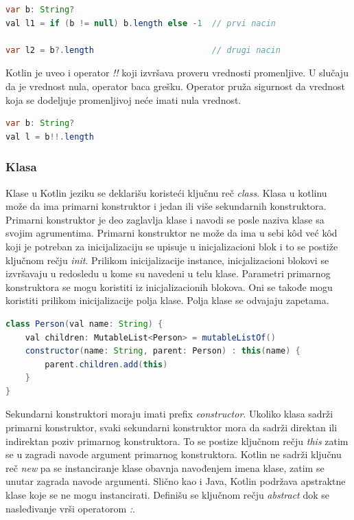 \documentclass[12pt,oneside]{memoir}
\begin{document}
\begin{lstlisting}[caption={Upravljanje nula vrednostima},captionpos=t, language=Java]
var b: String?
val l1 = if (b != null) b.length else -1  // prvi nacin
 
var l2 = b?.length                        // drugi nacin
\end{lstlisting}
 
Kotlin je uveo i operator \emph{!!} koji izvršava proveru vrednosti promenljive. U slučaju da je vrednost nula, operator baca grešku. Operator pruža sigurnost da vrednost koja se dodeljuje promenljivoj neće imati nula vrednost.
 
\begin{lstlisting}[caption={Koršćenje operatora !!},captionpos=t, language=Java]
var b: String?
val l = b!!.length
\end{lstlisting}
 
\subsubsection{Klasa}
Klase u Kotlin jeziku se deklarišu koristeći ključnu reč \emph{class}. Klasa u kotlinu može da ima primarni konstruktor i jedan ili više sekundarnih konstruktora. Primarni konstruktor je deo zaglavlja klase i navodi se posle naziva klase sa svojim agrumentima. Primarni konstruktor ne može da ima u sebi kôd već kôd koji je potreban za inicijalizaciju se upisuje u inicjalizacioni blok i to se postiže ključnom rečju \emph{init}. Prilikom inicijalizacije instance, inicjalizacioni blokovi se izvršavaju u redosledu u kome su navedeni u telu klase. Parametri primarnog konstruktora se mogu koristiti iz inicjalizacionih blokova. Oni se takođe mogu koristiti prilikom inicijalizacije polja klase. Polja klase se odvajaju zapetama. 
 
\begin{lstlisting}[caption={Klasa u Kotlin jeziku},captionpos=t, language=Java]
class Person(val name: String) {
    val children: MutableList<Person> = mutableListOf()
    constructor(name: String, parent: Person) : this(name) {
        parent.children.add(this)
    }
}
\end{lstlisting}
 
Sekundarni konstruktori moraju imati prefix \emph{constructor}. Ukoliko klasa sadrži primarni konstruktor, svaki sekundarni konstruktor mora da sadrži direktan ili indirektan poziv primarnog konstruktora. To se postize ključnom rečju \emph{this} zatim se u zagradi navode argument primarnog konstruktora. Kotlin ne sadrži ključnu reč \emph{new} pa se instanciranje klase obavnja navođenjem imena klase, zatim se unutar zagrada navode argumenti. Slično kao i Java, Kotlin podržava apstraktne klase koje se ne mogu instancirati. Definišu se ključnom rečju \emph{abstract} dok se nasleđivanje vrši operatorom \emph{:}.
 
\end{document}
